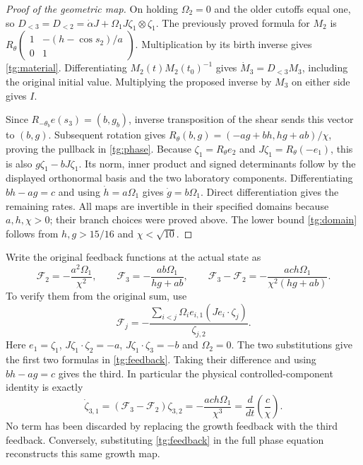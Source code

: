 \begin{proof}[Proof of the geometric map]
On holding $\Omega_2=0$ and the older cutoffs equal one, so
$D_{<3}=D_{<2}=\dot\alpha J+
\Omega_1J\zeta_1\otimes\zeta_1$.
The previously proved formula for $M_2$ is
$R_\theta\left(\begin{smallmatrix}1&-(h-\cos s_2)/a\\0&1\end{smallmatrix}\right)$.
Multiplication by its birth inverse gives \eqref{tg:material}.
Differentiating $M_2(t)M_2(t_0)^{-1}$ gives
$\dot M_3=D_{<3}M_3$, including the original initial value.
Multiplying the proposed inverse by $M_3$ on either side gives $I$.

Since $R_{-\theta_b}e(s_3)=(b,g_b)$, inverse transposition
of the shear sends this vector to $(b,g)$. Subsequent rotation gives
$R_\theta(b,g)=(-ag+bh,hg+ab)/\chi$, proving the pullback in
\eqref{tg:phase}. Because $\zeta_1=R_\theta e_2$ and
$J\zeta_1=R_\theta(-e_1)$, this is also
$g\zeta_1-bJ\zeta_1$. Its norm, inner product and signed
determinants follow by the displayed orthonormal basis and the two
laboratory components. Differentiating $bh-ag=c$ and using
$\dot h=a\Omega_1$ gives $\dot g=b\Omega_1$.
Direct differentiation gives the remaining rates.
All maps are invertible in their specified domains because
$a,h,\chi>0$; their branch choices were proved above.
The lower bound \eqref{tg:domain} follows from
$h,g>15/16$ and $\chi<\sqrt{10}$.
\end{proof}

Write the original feedback functions at the actual state as
\begin{equation}\label{tg:feedback}
 \mathcal F_2=-\frac{a^2\Omega_1}{\chi^2},\qquad
 \mathcal F_3=-\frac{ab\Omega_1}{hg+ab},\qquad
 \mathcal F_3-\mathcal F_2
    =-\frac{ach\Omega_1}{\chi^2(hg+ab)}.
\end{equation}
To verify them from the original sum, use
\[
 \mathcal F_j=-\frac{\sum_{i<j}\Omega_i e_{i,1}
                         (Je_i\cdot\zeta_j)}{\zeta_{j,2}}.
\]
Here $e_1=\zeta_1$, $J\zeta_1\cdot\zeta_2=-a$,
$J\zeta_1\cdot\zeta_3=-b$ and $\Omega_2=0$.
The two substitutions give the first two formulas in
\eqref{tg:feedback}. Taking their difference and using $bh-ag=c$
gives the third. In particular the physical controlled-component
identity is exactly
\[
 \dot\zeta_{3,1}=(\mathcal F_3-\mathcal F_2)\zeta_{3,2}
             =-\frac{ach\Omega_1}{\chi^3}
             =\frac{d}{dt}\left(\frac c\chi\right).
\]
No term has been discarded by replacing the growth feedback with
the third feedback. Conversely, substituting \eqref{tg:feedback}
in the full phase equation reconstructs this same growth map.

